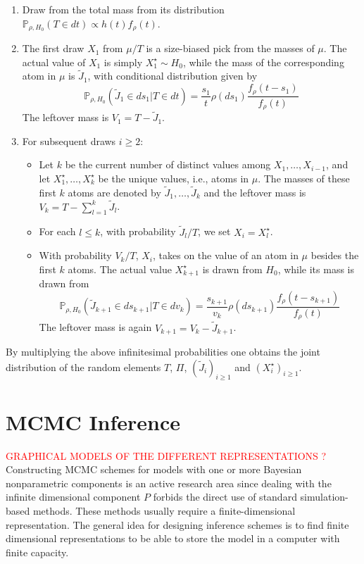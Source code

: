 \begin{enumerate}[label=(\roman*)]
    \item Draw from the total mass from its distribution $\mathbb{P}_{\rho,H_0}(T \in dt) \propto h(t) f_\rho(t)$.
    \item The first draw $X_1$ from $\mu/T$ is a size-biased pick from the masses of $\mu$. The actual
value of $X_1$ is simply $X_1^\star \sim H_0$, while the mass of the corresponding atom in $\mu$ is
$\tilde{J}_1$, with conditional distribution given by
$$ \mathbb{P}_{\rho,H_0}(\tilde{J}_1 \in ds_1 | T \in dt) = \frac{s_1}{t}\rho(ds_1)\frac{f_\rho(t - s_1)}{f_\rho(t)} $$
The leftover mass is $V_1 = T - \tilde{J}_1$.
    \item For subsequent draws $i \ge 2:$
    \begin{itemize}
        \item Let $k$ be the current number of distinct values among $X_1,\dots,X_{i-1}$, and let
$X_1^\star,\dots,X_{k}^\star$ be the unique values, i.e., atoms in $\mu$. The masses of these first
$k$ atoms are denoted by $\tilde{J}_{1},\dots,\tilde{J}_{k}$ and the leftover mass is $V_k = T - \sum_{l=1}^k{\tilde{J}_{l}}$.
        \item For each $l \le k$, with probability $\tilde{J}_l / T$, we set $X_i = X_l^\star$.
        \item With probability $V_k / T$, $X_i$, takes on the value of an atom in $\mu$ besides the first $k$ atoms. The actual value $X_{k+1}^\star$ is drawn from $H_0$, while its mass is drawn from
        $$ \mathbb{P}_{\rho,H_0}(\tilde{J}_{k+1} \in ds_{k+1} | T \in dv_k) = \frac{s_{k+1}}{v_k}\rho(ds_{k+1})\frac{f_\rho(t - s_{k+1})}{f_\rho(t)} $$
        The leftover mass is again $V_{k+1} = V_k - \tilde{J}_{k+1}$.
    \end{itemize}
\end{enumerate}

By multiplying the above infinitesimal probabilities one obtains the joint distribution of the random elements $T$, $\Pi$, $(\tilde{J}_i)_{i \ge 1}$ and $(X_i^\star)_{i \ge 1}$.

\section{MCMC Inference}
\textcolor{red}{GRAPHICAL MODELS OF THE DIFFERENT REPRESENTATIONS ?}
Constructing MCMC schemes for models with one or more Bayesian nonparametric components is an active research area since dealing with the infinite dimensional component $P$ forbids the direct use of standard simulation-based methods. These methods usually require a finite-dimensional representation. The general idea for designing inference schemes is to find finite dimensional representations to be able to store the model in a computer with finite capacity.

